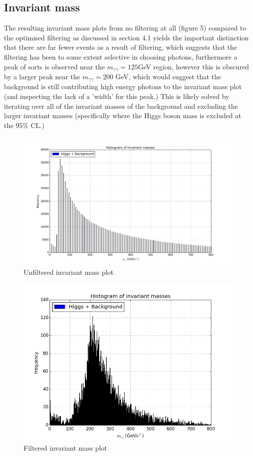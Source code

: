 \documentclass{article}
\begin{document}
\subsection{Invariant mass}
The resulting invariant mass plots from no filtering at all (figure 5) compared to the optimised filtering as discussed in section 4.1 yields the important distinction that there are far fewer events as a result of filtering, which suggests that the filtering has been to some extent selective in choosing photons, furthermore a peak of sorts is observed near the $m_{\gamma \gamma}=125$GeV region, however this is obscured by a larger peak near the $m_{\gamma \gamma} = 200$ GeV, which would suggest that the background is still contributing high energy photons to the invariant mass plot (and inspecting the lack of a 'width' for this peak.) This is likely solved by iterating over all of the invariant masses of the background and excluding the larger invariant masses (specifically where the Higgs boson mass is excluded at the 95\% CL.) 
\begin{figure}
\includegraphics[scale = 0.3]{First_unfiltered_invmass}
\caption{Unfiltered invariant mass plot}
\end{figure}
\begin{figure}
\includegraphics[scale = 0.5]{First_filtered_invmass}
\caption{Filtered invariant mass plot}
\end{figure}
\end{document}
